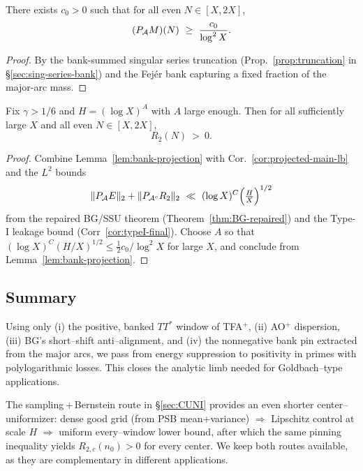 \begin{corollary}\label{cor:projected-main-lb}
There exists $c_0>0$ such that for all even $N\in[X,2X]$,
\[
(P_{\mathcal{A}} M)(N)\ \ge\ \frac{c_0}{\log^2 X}.
\]
\end{corollary}

\begin{proof}
By the bank-summed singular series truncation (Prop.~\ref{prop:truncation} in §\ref{sec:sing-series-bank}) and the Fejér bank capturing a fixed fraction of the major-arc mass.
\end{proof}

\begin{theorem}\label{thm:pointwise-projection}
Fix $\gamma>1/6$ and $H=(\log X)^A$ with $A$ large enough. Then for all sufficiently large $X$ and all even $N\in[X,2X]$,
\[
R_2(N)\ >\ 0.
\]
\end{theorem}

\begin{proof}
Combine Lemma~\ref{lem:bank-projection} with Cor.~\ref{cor:projected-main-lb} and the $L^2$ bounds
\[
\|\PA E\|_2 + \|P_{\cA^c}R_2\|_2\ \ll\ (\log X)^{C}\Big(\tfrac{H}{X}\Big)^{1/2}
\]
from the repaired BG/SSU theorem (Theorem~\ref{thm:BG-repaired}) and the Type-I leakage bound (Corr~\ref{cor:typeI-final}). 
Choose $A$ so that $(\log X)^{C}(H/X)^{1/2} \le \tfrac12 c_0/\log^2 X$ for large $X$, and conclude from Lemma~\ref{lem:bank-projection}.
\end{proof}


\subsection*{Summary}
Using only (i) the positive, banked $TT^\ast$ window of TFA$^+$, (ii) AO$^+$ dispersion, (iii) BG’s short–shift anti–alignment, and (iv) the nonnegative bank pin extracted from the major arcs, we pass from energy suppression to positivity in primes with polylogarithmic losses. This closes the analytic limb needed for Goldbach–type applications.

\begin{remark}[On alternatives]
The sampling\,+\,Bernstein route in \S\ref{sec:CUNI} provides an even shorter center–uniformizer: dense good grid (from PSB mean+variance) $\Rightarrow$ Lipschitz control at scale $H$ $\Rightarrow$ uniform every–window lower bound, after which the same pinning inequality yields $R_{2,c}(n_0)>0$ for every center. We keep both routes available, as they are complementary in different applications.
\end{remark}

